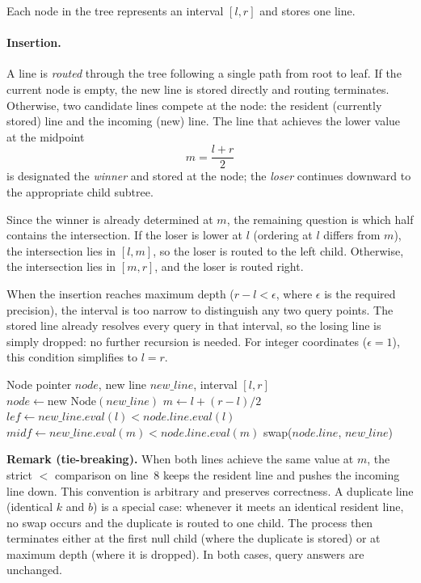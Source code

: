 \documentclass[11pt,a4paper]{article}
\theoremstyle{definition}
\theoremstyle{plain}
\begin{document}
Each node in the tree represents an interval $[l, r]$ and stores one line.

\paragraph{Insertion.} A line is \emph{routed} through the tree following a single path from root to leaf. If the current node is empty, the new line is stored directly and routing terminates. Otherwise, two candidate lines compete at the node: the resident (currently stored) line and the incoming (new) line. The line that achieves the lower value at the midpoint
\[
m = \frac{l+r}{2}
\]
is designated the \emph{winner} and stored at the node; the \emph{loser} continues downward to the appropriate child subtree.

Since the winner is already determined at $m$, the remaining question is which half contains the intersection. If the loser is lower at $l$ (ordering at $l$ differs from $m$), the intersection lies in $[l, m]$, so the loser is routed to the left child. Otherwise, the intersection lies in $[m, r]$, and the loser is routed right.

When the insertion reaches maximum depth ($r - l < \epsilon$, where $\epsilon$ is the required precision), the interval is too narrow to distinguish any two query points. The stored line already resolves every query in that interval, so the losing line is simply dropped: no further recursion is needed. For integer coordinates ($\epsilon = 1$), this condition simplifies to $l = r$.

\begin{algorithm}[H]
\caption{LICT Line Insertion}
\label{alg:insert}
\begin{algorithmic}[1]
\Require Node pointer $node$, new line $new\_line$, interval $[l, r]$
\State $node \gets \text{new Node}(new\_line)$
\State \Return
\EndIf
\State $m \gets l + (r - l) / 2$
\State $lef \gets new\_line.eval(l) < node.line.eval(l)$
\State $midf \gets new\_line.eval(m) < node.line.eval(m)$
\State swap($node.line$, $new\_line$)
\EndIf
{} 
\State \Return
\EndIf
{}
\State {}
\Else
\State {}
\EndIf
\end{algorithmic}
\end{algorithm}

\textbf{Remark (tie-breaking).} When both lines achieve the same value at $m$, the strict $<$ comparison on line~8 keeps the resident line and pushes the incoming line down. This convention is arbitrary and preserves correctness. A duplicate line (identical $k$ and $b$) is a special case: whenever it meets an identical resident line, no swap occurs and the duplicate is routed to one child. The process then terminates either at the first null child (where the duplicate is stored) or at maximum depth (where it is dropped). In both cases, query answers are unchanged.
\end{document}
